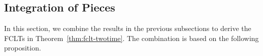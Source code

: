 \documentclass[11pt]{article}
\theoremstyle{plain}
\theoremstyle{definition}
\def\AM{{\mathcal A}}
\def\FM{{\mathcal F}}
\def\RB{{\mathbb R}}
\newcommand{\xbar}{{\bar{\textnormal{X}}}}
\newcommand{\zbar}{{\bar{\textnormal{Z}}}}
\begin{document}

\subsection{Integration of Pieces}
\label{sec:fclt:intergrate}

In this section, we combine the results in the previous subsections to derive the FCLTs in Theorem~\ref{thm:fclt-twotime}.
The combination is based on the following proposition.
\end{document}
